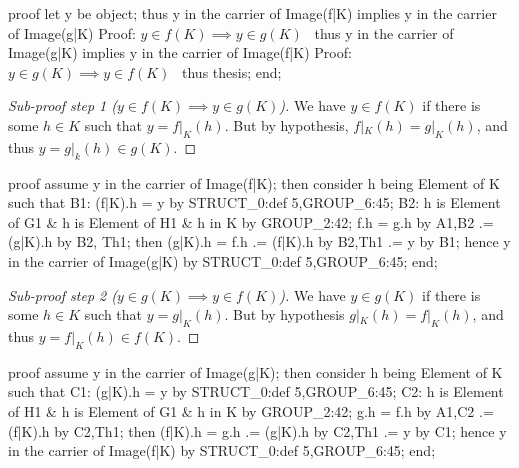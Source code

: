 \nwenddocs{}\endmoddef\nwstartdeflinemarkup{}\nwenddeflinemarkup
proof
  let y be object;
  thus y in the carrier of Image(f|K) implies y in the carrier of Image(g|K)
  \LA{}Proof: $y\in f(K)\implies y\in g(K)$~{\nwtagstyle{}}\RA{}
  thus y in the carrier of Image(g|K) implies y in the carrier of Image(f|K)
  \LA{}Proof: $y\in g(K)\implies y\in f(K)$~{\nwtagstyle{}}\RA{}
  thus thesis;
end;
\nwendcode{}\nwdocspar

\begin{proof}[Sub-proof step 1 ($y\in f(K)\implies y\in g(K)$)]
We have $y\in f(K)$ if there is some $h\in K$ such that $y=f|_{K}(h)$.
But by hypothesis, $f|_{K}(h)=g|_{K}(h)$, and thus $y=g|_{k}(h)\in g(K)$.
\end{proof}

\nwenddocs{}\endmoddef\nwstartdeflinemarkup{}\nwenddeflinemarkup
proof
  assume y in the carrier of Image(f|K);
  then consider h being Element of K such that
  B1: (f|K).h = y
  by STRUCT_0:def 5,GROUP_6:45;
  B2: h is Element of G1 & h is Element of H1 & h in K by GROUP_2:42;
  f.h = g.h by A1,B2
     .= (g|K).h by B2, Th1;
  then (g|K).h = f.h
              .= (f|K).h by B2,Th1
              .= y by B1;
  hence y in the carrier of Image(g|K) by STRUCT_0:def 5,GROUP_6:45;
end;
\nwendcode{}\nwdocspar

\begin{proof}[Sub-proof step 2 ($y\in g(K)\implies y\in f(K)$)]
  We have $y\in g(K)$ if there is some $h\in K$ such that $y=g|_{K}(h)$.
  But by hypothesis $g|_{K}(h) = f|_{K}(h)$, and thus $y = f|_{K}(h)\in f(K)$.
\end{proof}

\nwenddocs{}\endmoddef\nwstartdeflinemarkup{}\nwenddeflinemarkup
proof
  assume y in the carrier of Image(g|K);
  then consider h being Element of K such that
  C1: (g|K).h = y
  by STRUCT_0:def 5,GROUP_6:45;
  C2: h is Element of H1 & h is Element of G1 & h in K by GROUP_2:42;
  g.h = f.h by A1,C2
     .= (f|K).h by C2,Th1;
  then (f|K).h = g.h
              .= (g|K).h by C2,Th1
              .= y by C1;
  hence y in the carrier of Image(f|K) by STRUCT_0:def 5,GROUP_6:45;
end;
\nwendcode{}\nwdocspar


